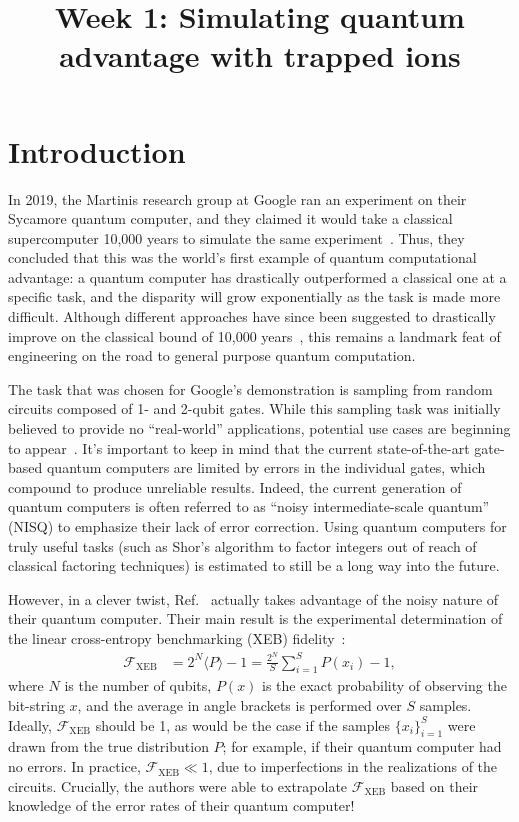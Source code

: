 \documentclass[12pt]{article}
\title{Week 1: Simulating quantum advantage with trapped ions}
\author{}
\date{}
\begin{document}
\maketitle

\thispagestyle{empty}


\section*{Introduction}

In 2019, the Martinis research group at Google ran an experiment on their Sycamore quantum computer, and they claimed it would take a classical supercomputer 10,000 years to simulate the same experiment~\autocite{arute2019quantum}.
Thus, they concluded that this was the world's first example of quantum computational advantage: a quantum computer has drastically outperformed a classical one at a specific task, and the disparity will grow exponentially as the task is made more difficult.
Although different approaches have since been suggested to drastically improve on the classical bound of 10,000 years~\autocite{pednault2019leveraging,pan2021simulating}, this remains a landmark feat of engineering on the road to general purpose quantum computation.

The task that was chosen for Google's demonstration is sampling from random circuits composed of 1- and 2-qubit gates.
While this sampling task was initially believed to provide no ``real-world'' applications, potential use cases are beginning to appear~\autocite{aaronson2018certified}.
It's important to keep in mind that the current state-of-the-art gate-based quantum computers are limited by errors in the individual gates, which compound to produce unreliable results.
Indeed, the current generation of quantum computers is often referred to as ``noisy intermediate-scale quantum'' (NISQ) to emphasize their lack of error correction.
Using quantum computers for truly useful tasks (such as Shor's algorithm to factor integers out of reach of classical factoring techniques) is estimated to still be a long way into the future.

However, in a clever twist, Ref.~ actually takes advantage of the noisy nature of their quantum computer.
Their main result is the experimental determination of the linear cross-entropy benchmarking (XEB) fidelity~\autocite{neill2018blueprint,boixo2018characterizing}:
\begin{align}
	\mathcal{F}_\mathrm{XEB}
	&= 2^N \langle P \rangle - 1
	= \frac{2^N}{S} \sum_{i=1}^S P(x_i) - 1,
\end{align}
where $N$ is the number of qubits, $P(x)$ is the exact probability of observing the bit-string $x$, and the average in angle brackets is performed over $S$ samples.
Ideally, $\mathcal{F}_\mathrm{XEB}$ should be 1, as would be the case if the samples $\{ x_i \}_{i=1}^S$ were drawn from the true distribution $P$; for example, if their quantum computer had no errors.
In practice, $\mathcal{F}_\mathrm{XEB} \ll 1$, due to imperfections in the realizations of the circuits.
Crucially, the authors were able to extrapolate $\mathcal{F}_\mathrm{XEB}$ based on their knowledge of the error rates of their quantum computer!
\end{document}
